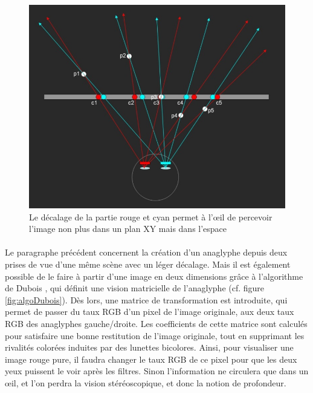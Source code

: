 \begin{figure}[h]
		\centering
		\includegraphics[scale=0.8]{anaglyph.png}
		\caption{\label{fig:anaglyph} Le décalage de la partie rouge et cyan permet à l’œil de percevoir l’image non plus dans un plan XY mais dans l’espace \protect \footnotemark }
\end{figure}

\paragraph{}
	Le paragraphe précédent concernent la création d’un anaglyphe depuis deux prises de vue d’une même scène avec un léger décalage. Mais il est également possible de le faire à partir d’une image en deux dimensions grâce à l’algorithme de Dubois \cite{algoDubois}, qui définit une vision matricielle de l’anaglyphe (cf. figure \ref{fig:algoDubois}). Dès lors, une matrice de transformation est introduite, qui permet de passer du taux RGB d’un pixel de l’image originale,  aux deux taux RGB des anaglyphes gauche/droite. Les coefficients de cette matrice sont calculés pour satisfaire une bonne restitution de l’image originale, tout en supprimant les rivalités colorées induites par des lunettes bicolores. Ainsi, pour visualiser une image rouge pure, il faudra changer le taux RGB de ce pixel pour que les deux yeux puissent le voir après les filtres. Sinon l’information ne circulera que dans un œil, et l’on perdra la vision stéréoscopique, et donc la notion de profondeur. 
	
